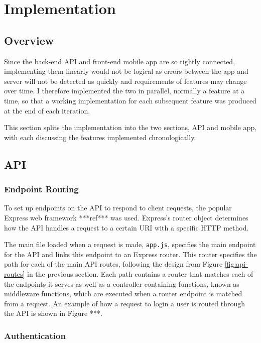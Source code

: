 \chapter{Implementation}


\section{Overview}

Since the back-end API and front-end mobile app are so tightly connected, implementing them linearly would not be logical as errors between the app and server will not be detected as quickly and requirements of features may change over time. I therefore implemented the two in parallel, normally a feature at a time, so that a working implementation for each subsequent feature was produced at the end of each iteration.

This section splits the implementation into the two sections, API and mobile app, with each discussing the features implemented chronologically.

\section{API}

\subsection{Endpoint Routing}

To set up endpoints on the API to respond to client requests, the popular Express web framework ***ref*** was used. Express's router object determines how the API handles a request to a certain URI with a specific HTTP method.

The main file loaded when a request is made, \texttt{app.js}, specifies the main endpoint for the API and links this endpoint to an Express router. This router specifies the path for each of the main API routes, following the design from Figure \ref{fig:api-routes} in the previous section. Each path contains a router that matches each of the endpoints it serves as well as a controller containing functions, known as middleware functions, which are executed when a router endpoint is matched from a request. An example of how a request to login a user is routed through the API is shown in Figure ***.

\subsection{Authentication}

